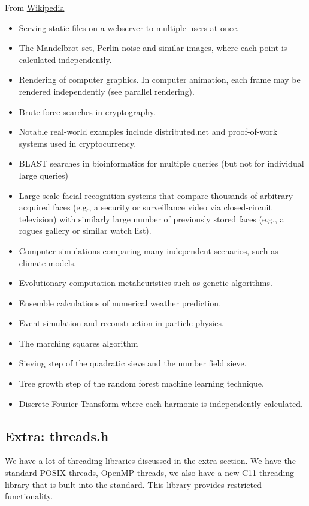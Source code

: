 From \href{https://en.wikipedia.org/wiki/Embarrassingly_parallel}{Wikipedia}
\begin{itemize}
\tightlist
\item Serving static files on a webserver to multiple users at once.
\item The Mandelbrot set, Perlin noise and similar images, where each point is calculated independently.
\item Rendering of computer graphics. In computer animation, each frame may be rendered independently (see parallel rendering).
\item Brute-force searches in cryptography.
\item Notable real-world examples include distributed.net and proof-of-work systems used in cryptocurrency.
\item BLAST searches in bioinformatics for multiple queries (but not for individual large queries)
\item Large scale facial recognition systems that compare thousands of arbitrary acquired faces (e.g., a security or surveillance video via closed-circuit television) with similarly large number of previously stored faces (e.g., a rogues gallery or similar watch list).
\item Computer simulations comparing many independent scenarios, such as climate models.
\item Evolutionary computation metaheuristics such as genetic algorithms.
\item Ensemble calculations of numerical weather prediction.
\item Event simulation and reconstruction in particle physics.
\item The marching squares algorithm
\item Sieving step of the quadratic sieve and the number field sieve.
\item Tree growth step of the random forest machine learning technique.
\item Discrete Fourier Transform where each harmonic is independently calculated.
\end{itemize}

\subsection{Extra: threads.h}

We have a lot of threading libraries discussed in the extra section.
We have the standard POSIX threads, OpenMP threads, we also have a new C11 threading library that is built into the standard.
This library provides restricted functionality.

